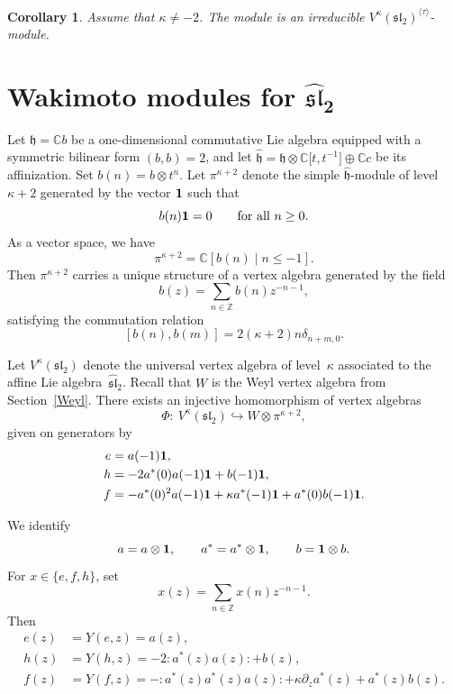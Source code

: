 \documentclass[10pt,a4paper]{amsart}
\numberwithin{equation}{section}
\newtheorem{Corollary}[Theorem]{Corollary}
\theoremstyle{definition}
\newcommand{\1}{\textbf{1}}
\begin{document}
\begin{Corollary}
Assume that $\kappa \ne -2$. The module  is an irreducible
$V^{\kappa}(\mathfrak{sl}_{2})^{\langle \tau \rangle}$-module.
\end{Corollary}

\section[Wakimoto modules for widehat sl\_2]{Wakimoto modules for $\boldsymbol{\widehat{\mathfrak{sl}}_{2}}$}
\label{section-Wakimoto-1}

Let $\mathfrak{h} = \mathbb{C}b$ be a one-dimensional commutative Lie algebra equipped with a symmetric bilinear form
$(b,b) = 2$, and let $\widehat{\mathfrak{h}} = \mathfrak{h} \otimes \mathbb{C}\bigl[t,t^{-1}\bigr] \oplus \mathbb{C}c$
be its affinization.
Set $b(n) = b \otimes t^{n}$.
Let $\pi^{\kappa+2}$ denote the simple $\widehat{\mathfrak{h}}$-module of level $\kappa+2$ generated by the vector ${\bf 1}$ such that
\[
 b(n) {\bf 1} = 0 \qquad \text{for all } n \ge 0.
\]
As a vector space, we have
\[
 \pi^{\kappa+2} = \mathbb{C}[b(n) \mid n \le -1].
\]
Then $\pi^{\kappa+2}$ carries a unique structure of a vertex algebra generated by the field
\[
 b(z) = \sum_{n \in \mathbb{Z}} b(n) z^{-n-1},
\]
satisfying the commutation relation
\[
 [b(n), b(m)] = 2(\kappa + 2) n \delta_{n+m,0}.
\]

Let $V^{\kappa}(\mathfrak{sl}_{2})$ denote the universal vertex algebra of level~$\kappa$ associated to the affine Lie algebra~$\widehat{\mathfrak{sl}}_{2}$.
Recall that $W$ is the Weyl vertex algebra from Section~\ref{Weyl}.
There exists an injective homomorphism of vertex algebras
\[
 \Phi \colon \ V^{\kappa}(\mathfrak{sl}_{2}) \hookrightarrow W \otimes \pi^{\kappa+2},
\]
given on generators by
\begin{align*}
 e &= a(-1){\bf 1}, \\
 h &= -2 a^{*}(0)a(-1){\bf 1} + b(-1){\bf 1}, \\
 f &= -a^{*}(0)^{2} a(-1){\bf 1} + \kappa a^{*}(-1){\bf 1} + a^{*}(0) b(-1){\bf 1}.
\end{align*}


We identify
\[
 a = a \otimes {\bf 1}, \qquad
 a^{*} = a^{*} \otimes {\bf 1}, \qquad
 b = {\bf 1} \otimes b.
\]
For $x \in \{ e, f, h \}$, set
\[
 x(z) = \sum_{n \in \mathbb{Z}} x(n) z^{-n-1}.
\]
Then
\begin{align*}
 e(z) &= Y(e,z) = a(z), \\
 h(z) &= Y(h,z) = -2 {:}a^{*}(z)a(z){:} + b(z), \\
 f(z) &= Y(f,z) = -{:}a^{*}(z)a^{*}(z)a(z){:} + \kappa \partial_{z}a^{*}(z) + a^{*}(z)b(z).
\end{align*}
\end{document}
